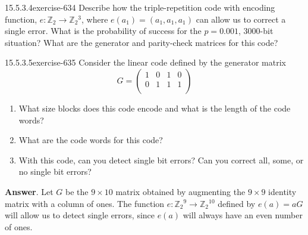 \documentclass[twoside,10pt,]{book}
\numberwithin{equation}{section}
\begin{document}
\begin{divisionsolution}{15.5.3.4}{}{exercise-634}%
\hypertarget{p-5676}{}%
Describe how the triple-repetition code with encoding function, \(e:\mathbb{Z}_2\to \mathbb{Z}_2{}^3\), where \(e\left(a_1\right) = \left(a_1,a_1,a_1\right)\) can allow us to correct a single error. What is the probability of success for the \(p = 0.001\), 3000-bit situation?  What are the generator and parity-check matrices for this code?%
\end{divisionsolution}%
\begin{divisionsolution}{15.5.3.5}{}{exercise-635}%
\hypertarget{p-5677}{}%
Consider the  linear code defined by the generator matrix%
\begin{equation*}
G=\left(
\begin{array}{cccc}
1 & 0 & 1 & 0 \\
0 & 1 & 1 & 1 \\
\end{array}
\right)
\end{equation*}
%
\par
\hypertarget{p-5678}{}%
\leavevmode%
\begin{enumerate}[label=(\alph*)]
\item\hypertarget{li-2501}{}\hypertarget{p-5679}{}%
What size blocks does this code encode and what is the length of the code words?%
\item\hypertarget{li-2502}{}\hypertarget{p-5680}{}%
What are the code words for this code?%
\item\hypertarget{li-2503}{}\hypertarget{p-5681}{}%
With this code, can you detect single bit errors?  Can you correct all, some, or no single bit errors?%
\end{enumerate}
%
\par\smallskip%
\noindent\textbf{Answer}.\quad%
\hypertarget{p-5682}{}%
Let \(G\) be the \(9 \times 10\) matrix obtained by augmenting the \(9\times 9\) identity matrix with a column of ones. The function \(e:\mathbb{Z}_2{}^9\to \mathbb{Z}_2{}^{10}\)  defined by \(e(a) = a G\) will allow us to detect single errors, since \(e(a)\) will always have an even number of ones.%
\end{divisionsolution}%
\end{document}
